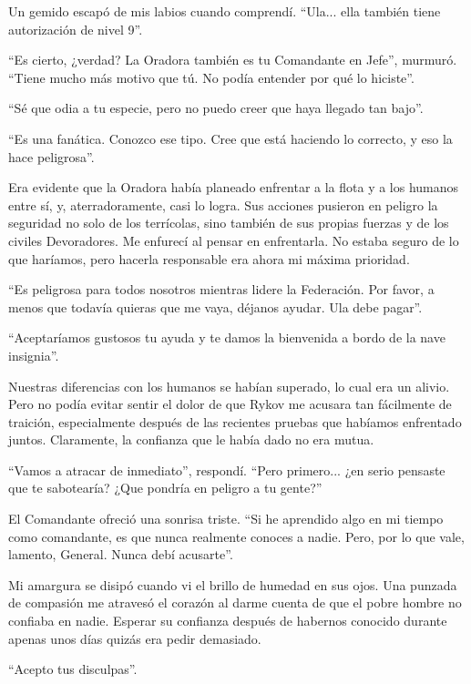 \documentclass[spanish,12pt,a4paper,oneside,titlepage]{book}
\begin{document}
    Un gemido escapó de mis labios cuando comprendí. ``Ula... ella también tiene autorización de nivel 9''.

    ``Es cierto, ¿verdad? La Oradora también es tu Comandante en Jefe'', murmuró. ``Tiene mucho más motivo que tú. No podía entender por qué lo hiciste''.

    ``Sé que odia a tu especie, pero no puedo creer que haya llegado tan bajo''.

    ``Es una fanática. Conozco ese tipo. Cree que está haciendo lo correcto, y eso la hace peligrosa''.

    Era evidente que la Oradora había planeado enfrentar a la flota y a los humanos entre sí, y, aterradoramente, casi lo logra. Sus acciones pusieron en peligro la seguridad no solo de los terrícolas, sino también de sus propias fuerzas y de los civiles Devoradores. Me enfurecí al pensar en enfrentarla. No estaba seguro de lo que haríamos, pero hacerla responsable era ahora mi máxima prioridad.

    ``Es peligrosa para todos nosotros mientras lidere la Federación. Por favor, a menos que todavía quieras que me vaya, déjanos ayudar. Ula debe pagar''.

    ``Aceptaríamos gustosos tu ayuda y te damos la bienvenida a bordo de la nave insignia''.

    Nuestras diferencias con los humanos se habían superado, lo cual era un alivio. Pero no podía evitar sentir el dolor de que Rykov me acusara tan fácilmente de traición, especialmente después de las recientes pruebas que habíamos enfrentado juntos. Claramente, la confianza que le había dado no era mutua.

    ``Vamos a atracar de inmediato'', respondí. ``Pero primero... ¿en serio pensaste que te sabotearía? ¿Que pondría en peligro a tu gente?''

    El Comandante ofreció una sonrisa triste. ``Si he aprendido algo en mi tiempo como comandante, es que nunca realmente conoces a nadie. Pero, por lo que vale, lamento, General. Nunca debí acusarte''.

    Mi amargura se disipó cuando vi el brillo de humedad en sus ojos. Una punzada de compasión me atravesó el corazón al darme cuenta de que el pobre hombre no confiaba en nadie. Esperar su confianza después de habernos conocido durante apenas unos días quizás era pedir demasiado.

    ``Acepto tus disculpas''.

\end{document}
